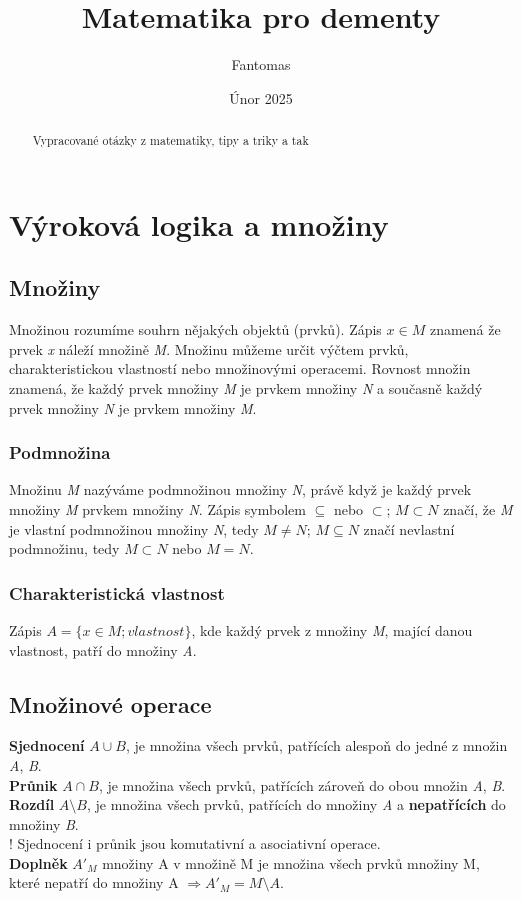 \documentclass[12pt, a4paper]{article}
\title{Matematika pro dementy}
\author{Fantomas}
\date{Únor 2025}
\begin{document}
\maketitle
\pagebreak
\begin{abstract}
Vypracované otázky z matematiky, tipy a triky a tak
\end{abstract}
\pagebreak

\tableofcontents

\pagebreak
\section{Výroková logika a množiny}

\subsection*{Množiny}
Množinou rozumíme souhrn nějakých objektů (prvků). Zápis $x \in M$ znamená že prvek \textit{x} náleží množině \textit{M}. Množinu můžeme určit výčtem prvků, charakteristickou vlastností nebo 
množinovými operacemi. Rovnost množin znamená, že každý prvek množiny \textit{M} je prvkem množiny \textit{N} a současně každý prvek množiny \textit{N} je prvkem množiny \textit{M}.

\subsubsection*{Podmnožina}
Množinu \textit{M} nazýváme podmnožinou množiny \textit{N}, právě když je každý prvek množiny \textit{M} prvkem množiny \textit{N}. Zápis symbolem $\subseteq$ nebo $\subset$; $M\subset N$ značí, že \textit{M} je vlastní podmnožinou množiny \textit{N}, tedy $M \neq N$; $M \subseteq N$ značí nevlastní podmnožinu, tedy $M \subset N$ nebo $M = N$.

\subsubsection*{Charakteristická vlastnost}
Zápis $A=\{x \in M; vlastnost\}$, kde každý prvek z množiny \textit{M}, mající danou vlastnost, patří do množiny \textit{A}.

\subsection*{Množinové operace}
\textbf{Sjednocení} $A \cup B$, je množina všech prvků, patřících alespoň do jedné z množin \textit{A}, \textit{B}.\\
\textbf{Průnik} $A \cap B$, je množina všech prvků, patřících zároveň do obou množin \textit{A}, \textit{B}.\\
\textbf{Rozdíl} $A \setminus B$, je množina všech prvků, patřících do množiny \textit{A} a \textbf{nepatřících} do množiny \textit{B}.\\
! Sjednocení i průnik jsou komutativní a asociativní operace.\\
\textbf{Doplněk} $A'_M $ množiny A v množině M je množina všech prvků množiny M, které nepatří do množiny A $\Rightarrow A'_M = M \setminus A$.
\end{document}
